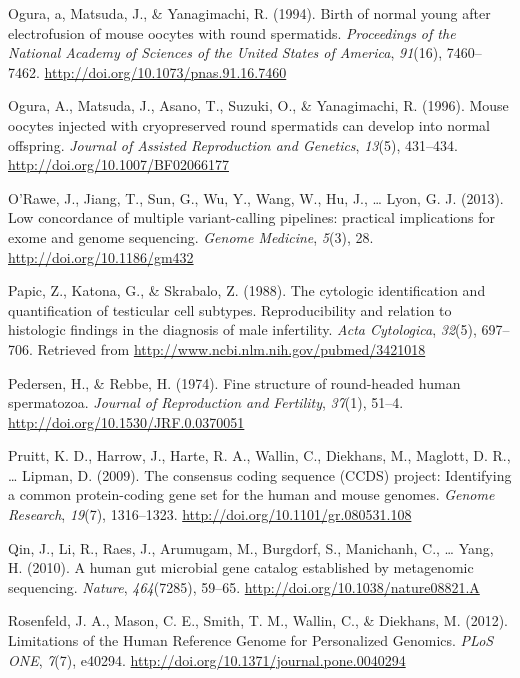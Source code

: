 \documentclass[12pt,twoside]{reedthesis}
\theoremstyle{definition}
\theoremstyle{definition}
\theoremstyle{remark}
\begin{document}
  \hypertarget{ref-Ogura1994}{}
  Ogura, a, Matsuda, J., \& Yanagimachi, R. (1994). Birth of normal young
  after electrofusion of mouse oocytes with round spermatids.
  \emph{Proceedings of the National Academy of Sciences of the United
  States of America}, \emph{91}(16), 7460--7462.
  \url{http://doi.org/10.1073/pnas.91.16.7460}
  
  \hypertarget{ref-Kimura1995}{}
  Ogura, A., Matsuda, J., Asano, T., Suzuki, O., \& Yanagimachi, R.
  (1996). Mouse oocytes injected with cryopreserved round spermatids can
  develop into normal offspring. \emph{Journal of Assisted Reproduction
  and Genetics}, \emph{13}(5), 431--434.
  \url{http://doi.org/10.1007/BF02066177}
  
  \hypertarget{ref-ORawe2013}{}
  O'Rawe, J., Jiang, T., Sun, G., Wu, Y., Wang, W., Hu, J., \ldots{} Lyon,
  G. J. (2013). Low concordance of multiple variant-calling pipelines:
  practical implications for exome and genome sequencing. \emph{Genome
  Medicine}, \emph{5}(3), 28. \url{http://doi.org/10.1186/gm432}
  
  \hypertarget{ref-Papic}{}
  Papic, Z., Katona, G., \& Skrabalo, Z. (1988). The cytologic
  identification and quantification of testicular cell subtypes.
  Reproducibility and relation to histologic findings in the diagnosis of
  male infertility. \emph{Acta Cytologica}, \emph{32}(5), 697--706.
  Retrieved from \url{http://www.ncbi.nlm.nih.gov/pubmed/3421018}
  
  \hypertarget{ref-Pedersen1974}{}
  Pedersen, H., \& Rebbe, H. (1974). Fine structure of round-headed human
  spermatozoa. \emph{Journal of Reproduction and Fertility}, \emph{37}(1),
  51--4. \url{http://doi.org/10.1530/JRF.0.0370051}
  
  \hypertarget{ref-Pruitt2009}{}
  Pruitt, K. D., Harrow, J., Harte, R. A., Wallin, C., Diekhans, M.,
  Maglott, D. R., \ldots{} Lipman, D. (2009). The consensus coding
  sequence (CCDS) project: Identifying a common protein-coding gene set
  for the human and mouse genomes. \emph{Genome Research}, \emph{19}(7),
  1316--1323. \url{http://doi.org/10.1101/gr.080531.108}
  
  \hypertarget{ref-Qin2010}{}
  Qin, J., Li, R., Raes, J., Arumugam, M., Burgdorf, S., Manichanh, C.,
  \ldots{} Yang, H. (2010). A human gut microbial gene catalog established
  by metagenomic sequencing. \emph{Nature}, \emph{464}(7285), 59--65.
  \url{http://doi.org/10.1038/nature08821.A}
  
  \hypertarget{ref-Rosenfeld2012}{}
  Rosenfeld, J. A., Mason, C. E., Smith, T. M., Wallin, C., \& Diekhans,
  M. (2012). Limitations of the Human Reference Genome for Personalized
  Genomics. \emph{PLoS ONE}, \emph{7}(7), e40294.
  \url{http://doi.org/10.1371/journal.pone.0040294}
  
\end{document}

